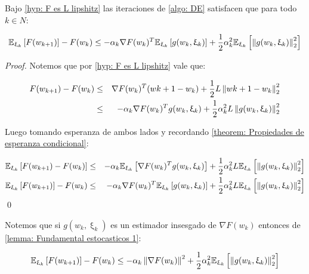 \begin{lemma}
	\label{lemma: Fundamental estocasticos 1}
	Bajo \ref{hyp: F es L lipshitz} las iteraciones de \ref{algo: DE} satisfacen que para todo $k \in N$:
	
	\begin{equation}
	\mathbb{E}_{\upxi_{k}} \left[F(w_{k+1})\right] - F(w_k) \leq - \alpha_k \nabla F(w_k) ^T \mathbb{E}_{\upxi_{k}} \left[g(w_k, \upxi_{k})\right] + \frac{1}{2} \alpha_k^2 \mathbb{E}_{\upxi_{k}} \left[\left\lVert g(w_k, \upxi_{k})\right\rVert^2_2\right]
	\end{equation}
	
\end{lemma}

\begin{proof}
	Notemos que por \ref{hyp: F es L lipshitz} vale que:
	
	\begin{equation*}
	\begin{aligned}
	F(w_{k+1}) - F(w_k) & \leq &  \nabla F(w_k)^T(w{k+1}-w_k) + \frac{1}{2}L \left\lVert w{k+1}-w_k\right\rVert^2_2 \\
	& \leq & - \alpha_k \nabla F(w_k)^Tg(w_k, \upxi_{k}) + \frac{1}{2} \alpha_k^2 L \left\lVert g(w_k, \upxi_{k})\right\rVert^2_2 
	\end{aligned}
	\end{equation*}
	
	Luego tomando esperanza de ambos lados y recordando \ref{theorem: Propiedades de esperanza condicional}:
	
	\begin{equation*}
	\begin{aligned}
	\mathbb{E}_{\upxi_{k}} \left[F(w_{k+1}) - F(w_k)\right] & \leq & - \alpha_k \mathbb{E}_{\upxi_{k}} \left[\nabla F(w_k)^Tg(w_k, \upxi_{k})\right] + \frac{1}{2} \alpha_k^2 L \mathbb{E}_{\upxi_{k}} \left[\left\lVert g(w_k, \upxi_{k})\right\rVert^2_2 \right] \\
	\mathbb{E}_{\upxi_{k}} \left[F(w_{k+1})\right] - F(w_k) & \leq & - \alpha_k \nabla F(w_k)^T \mathbb{E}_{\upxi_{k}} \left[g(w_k, \upxi_{k})\right]+ \frac{1}{2} \alpha_k^2 L \mathbb{E}_{\upxi_{k}} \left[\left\lVert g(w_k, \upxi_{k})\right\rVert^2_2 \right] 
	\end{aligned}
	\end{equation*}
	\qed
	
\end{proof}

\begin{remark}
	Notemos que si $g(w_k, \upxi_{k})$ es un estimador insesgado de $\nabla F (w_k)$ entonces de \ref{lemma: Fundamental estocasticos 1}:
	
	\begin{equation}
	\mathbb{E}_{\upxi_{k}} \left[F(w_{k+1})\right] - F(w_k) \leq - \alpha_k \left\lVert\nabla F(w_k)\right\rVert^2 + \frac{1}{2} \alpha_k^2 \mathbb{E}_{\upxi_{k}} \left[\left\lVert g(w_k, \upxi_{k})\right\rVert^2_2\right]
	\end{equation}
	
\end{remark}

